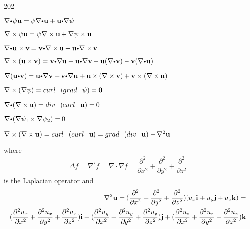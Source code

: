 \begin{thm} \mbox{}
 \begin{dingautolist}{202}
\item $\nabla \bp \psi \vector{u} = \psi \nabla \bp \vector{u} + \vector{u} \bp \nabla \psi$
\item $
\nabla \times \psi \mathbf{ u} = \psi \nabla \times \mathbf{ u} + \nabla \psi \times \mathbf{ u}$
\item $ \nabla \bp \vector{u} \times \vector{v} = 
\vector{v} \bp \nabla \times \vector{u} - 
\vector{u} \bp \nabla \times \vector{v}$
\item $ \nabla \times (\vector{u} \times \vector{v}) = 
\vector{v} \bp \nabla \vector{u} - 
\vector{u} \bp \nabla \vector{v} +
\vector{u} (\nabla \bp  \vector{v}) -
\vector{v} (\nabla \bp  \vector{u})$
\item $ \nabla (\vector{u} \bp \vector{v}) = 
\vector{u} \bp \nabla \vector{v} + 
\vector{v} \bp \nabla \vector{u} +
\vector{u} \times (\nabla \times  \vector{v}) +
\vector{v} \times (\nabla \times  \vector{u})$
\item $
\nabla \times (\nabla \psi) = curl \hspace{0.1in}(grad \hspace{0.1in}\psi) = \mathbf{  0}$
\item $\nabla \bp (\nabla \times \vector{u}) = div \hspace{0.1in}(curl \hspace{0.1in}\vector{u}) = 0$
\item $ \nabla \bp (\nabla \psi_{1} \times \nabla \psi_{2}) = 0$
\item $ \nabla \times (\nabla \times \mathbf{ u}) = curl \hspace{0.1in}(curl \hspace{0.1in}\mathbf{ u}) =
grad \hspace{0.1in}(div \hspace{0.1in}\mathbf{ u}) - \nabla^{2} \mathbf{ u}$
\end{dingautolist}

where 
\begin{eqnarray*}
\Delta f = \nabla^2 f = \nabla \cdot \nabla f  = 
\dfrac{\partial^{2}}{\partial x^{2}} + 
\dfrac{\partial^{2}}{\partial y^{2}} +
\dfrac{\partial^{2}}{\partial z^{2}}
\end{eqnarray*}
is the Laplacian operator and
\begin{eqnarray*}
\nabla^{2} \mathbf{ u} = 
(\dfrac{\partial^{2}}{\partial x^{2}} + 
\dfrac{\partial^{2}}{\partial y^{2}} +
\dfrac{\partial^{2}}{\partial z^{2}}) 
(u_{x} \mathbf{  i} + u_{y} \mathbf{  j} + u_{z} \mathbf{  k}) = \\
(\dfrac{\partial^{2} u_{x}}{\partial x^{2}} + 
 \dfrac{\partial^{2} u_{x}}{\partial y^{2}} +
 \dfrac{\partial^{2} u_{x}}{\partial z^{2}}) \mathbf{  i} +
(\dfrac{\partial^{2} u_{y}}{\partial x^{2}} + 
 \dfrac{\partial^{2} u_{y}}{\partial y^{2}} +
 \dfrac{\partial^{2} u_{y}}{\partial z^{2}}) \mathbf{  j} +
(\dfrac{\partial^{2} u_{z}}{\partial x^{2}} + 
 \dfrac{\partial^{2} u_{z}}{\partial y^{2}} +
 \dfrac{\partial^{2} u_{z}}{\partial z^{2}}) \mathbf{  k}
\end{eqnarray*}
\end{thm}


